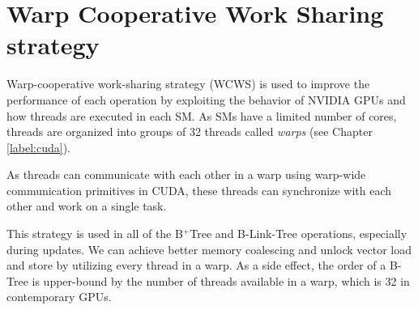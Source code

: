 \section{Warp Cooperative Work Sharing strategy}

Warp-cooperative work-sharing strategy (WCWS) is used to improve the performance of each operation by exploiting the behavior of NVIDIA GPUs and how threads are executed in each SM. As SMs have a limited number of cores, threads are organized into groups of 32 threads called \textit{warps} (see Chapter \ref{label:cuda}).


As threads can communicate with each other in a warp using warp-wide communication primitives in CUDA, these threads can synchronize with each other and work on a single task.

This strategy is used in all of the B$^+$Tree and B-Link-Tree operations, especially during updates. We can achieve better memory coalescing and unlock vector load and store by utilizing every thread in a warp. As a side effect, the order of a B-Tree is upper-bound by the number of threads available in a warp, which is 32 in contemporary GPUs.